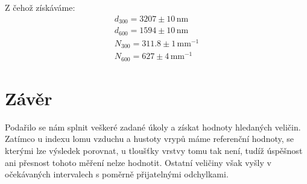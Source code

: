 \documentclass[czech,11pt,a4paper]{article}
\begin{document}
		\begin{multicols}{2}
		Z čehož získáváme:
		\begin{gather*}
			d_{300} = 3207 \pm 10 \,\mathrm{nm}\\
			d_{600} = 1594 \pm 10 \,\mathrm{nm}\\
			N_{300} = 311.8 \pm 1 \,\mathrm{mm^{-1}}\\
			N_{600} = 627 \pm 4 \,\mathrm{mm^{-1}}
		\end{gather*}
		
		\section{Závěr}
		Podařilo se nám splnit veškeré zadané úkoly a získat hodnoty hledaných veličin. Zatímco u indexu lomu vzduchu a hustoty vrypů máme referenční hodnoty, se kterými lze výsledek porovnat, u tloušťky vrstvy tomu tak není, tudíž úspěšnost ani přesnost tohoto měření nelze hodnotit. Ostatní veličiny však vyšly v očekávaných intervalech s poměrně přijatelnými odchylkami.
		
	
		

		
		
		
		
		
		\end{multicols}
\end{document}
